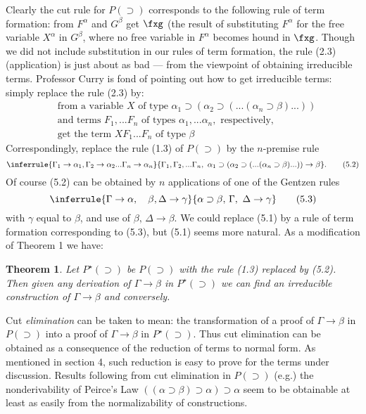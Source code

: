 \documentclass[12pt]{article}
\def\imp{\rightarrow}
\def\D{D}
\def\limp{\supset}
\def\PI{P(\limp)}
\def\G{\Gamma}
\def\a{\alpha}
\def\b{\beta}
\def\D{\Delta}
\def\PIstar{P^\star(\limp)}
\def\gimpb{\G \imp \b}
\newtheorem{theorem}{Theorem}
\begin{document}
Clearly the cut rule for $\PI$ corresponds to the following rule of term formation: from $F^\a$ and $G^\b$ get $\fxg$ (the result of substituting $F^\a$ for the free variable $X^\a$ in $G^\b$, where no free variable in $F^\a$ becomes hound in $\fxg$. Though we did not include substitution in our rules of term formation, the rule (2.3) (application) is just about as bad --- from the viewpoint of obtaining irreducible terms. Professor Curry is fond of pointing out how to get irreducible terms: simply replace the rule (2.3) by:
\begin{align*}
&{\text{from a variable }} X \text{ of type } \a_1 \limp (\a_2 \limp ( ... ( \a_n \limp \b)... ))\\
\tag{5.1}&\text{and terms } F_1, ... F_n \text{ of types }  \a_1, ... \a_n, \text{ respectively,} \\ 
&\text{get the term }  XF_1 ... F_n\text{ of type } \b
\end{align*}
Correspondingly, replace the rule (1.3) of $\PI$ by the $n$-premise rule
\begin{equation}
\inferrule{\G_1 \imp \a_1, \G_2 \imp \a_2 ... \G_n \imp \a_n}{\G_1, \G_2, ... \G_n,\,\,  \a_1 \limp (\a_2 \limp ( ... ( \a_n \limp \b)... )) \imp \b}.
\tag{5.2}
\end{equation}
Of course (5.2) can be obtained by $n$ applications of one of the Gentzen rules
\begin{equation}
\inferrule{\G \imp \a, \quad \b, \D \imp \gamma}{\a \limp \b, \,\G, \,\,\D \imp \gamma}
\tag{5.3}
\end{equation}
with $\gamma$ equal to $\b$, and use of $\b,\, \D \imp \b$. We could replace (5.1) by a rule of term formation corresponding to (5.3), but (5.1) seems more natural. As a modification of Theorem 1 we have:

\begin{theorem}
Let $\PIstar$ be $\PI$ with the rule {\rm (1.3)} replaced by {\rm (5.2)}. Then given any derivation of $\G \imp \b$
in  $\PIstar$ we can find an irreducible construction of $\G \imp \b$ and conversely.
\end{theorem}
Cut {\it elimination} can be taken to mean: the transformation of a proof of $\gimpb$ in $\PI$ into a proof of $\gimpb$ in $\PIstar$. Thus cut elimination can be obtained as a consequence of the reduction of terms to normal form. As mentioned in section 4, such reduction is easy to prove for the terms under discussion. Results following from cut elimination in $\PI$ (e.g.) the nonderivability of Peirce's Law $((\a \limp \b) \limp \a) \limp \a$ seem to be obtainable at least as easily from the normalizability of constructions.
\end{document}
